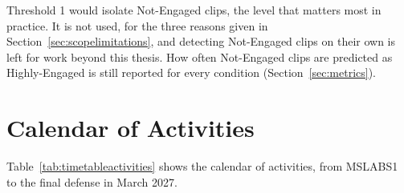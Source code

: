 Threshold 1 would isolate Not-Engaged clips, the level that matters most in practice. It is not used, for the three reasons given in Section~\ref{sec:scopelimitations}, and detecting Not-Engaged clips on their own is left for work beyond this thesis. How often Not-Engaged clips are predicted as Highly-Engaged is still reported for every condition (Section~\ref{sec:metrics}).



\section{Calendar of Activities}
\label{sec:calendar}

Table~\ref{tab:timetableactivities} shows the calendar of activities, from MSLABS1 to the final defense in March 2027.

